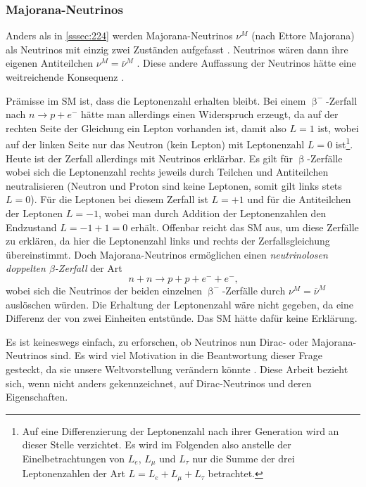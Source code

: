 \documentclass[a4paper,12pt]{article}
\begin{document}
\subsubsection{Majorana-Neutrinos} \label{sssec:225}
Anders als in \cref{sssec:224} werden Majorana-Neutrinos $\nu^M$ (nach Ettore Majorana) als Neutrinos mit einzig zwei Zuständen aufgefasst \cite[24]{Athar2020}. Neutrinos wären dann ihre eigenen Antiteilchen $\nu^M=\overline{\nu}^M$ \cite[286]{Zyla2020}. Diese andere Auffassung der Neutrinos hätte eine weitreichende Konsequenz \cite[25]{Athar2020}. \par
Prämisse im SM ist, dass die Leptonenzahl erhalten bleibt. Bei einem $\upbeta^-$-Zerfall nach $n \rightarrow p + e^-$ hätte man allerdings einen Widerspruch erzeugt, da auf der rechten Seite der Gleichung ein Lepton vorhanden ist, damit also $L=1$ ist, wobei auf der linken Seite nur das Neutron (kein Lepton) mit Leptonenzahl $L=0$ ist\footnote{Auf eine Differenzierung der Leptonenzahl nach ihrer Generation wird an dieser Stelle verzichtet. Es wird im Folgenden also anstelle der Einelbetrachtungen von $L_e$, $L_\mu$ und $L_\tau$ nur die Summe der drei Leptonenzahlen der Art $L=L_e+L_\mu+L_\tau$ betrachtet.}. Heute ist der Zerfall allerdings mit Neutrinos erklärbar. Es gilt für $\upbeta$-Zerfälle
wobei sich die Leptonenzahl rechts jeweils durch Teilchen und Antiteilchen neutralisieren (Neutron und Proton sind keine Leptonen, somit gilt links stets $L=0$). Für die Leptonen bei diesem Zerfall ist $L=+1$ und für die Antiteilchen der Leptonen $L=-1$, wobei man durch Addition der Leptonenzahlen den Endzustand $L=-1+1=0$ erhält. Offenbar reicht das SM aus, um diese Zerfälle zu erklären, da hier die Leptonenzahl links und rechts der Zerfallsgleichung übereinstimmt. Doch Majorana-Neutrinos ermöglichen einen \emph{neutrinolosen doppelten $\beta$-Zerfall} der Art
\begin{equation}
n + n \rightarrow p + p + e^- + e^- \text{,}
\end{equation}
wobei sich die Neutrinos der beiden einzelnen $\upbeta^-$-Zerfälle durch $\nu^M = \overline{\nu}^M$ auslöschen würden. Die Erhaltung der Leptonenzahl wäre nicht gegeben, da eine Differenz der von zwei Einheiten entstünde. Das SM hätte dafür keine Erklärung. \par
Es ist keineswegs einfach, zu erforschen, ob Neutrinos nun Dirac- oder Majorana-Neutrinos sind. Es wird viel Motivation in die Beantwortung dieser Frage gesteckt, da sie unsere Weltvorstellung verändern könnte \cite{Cirigliano2022}\cite{Balantekin2019}. Diese Arbeit bezieht sich, wenn nicht anders gekennzeichnet, auf Dirac-Neutrinos und deren Eigenschaften. \par
\end{document}
